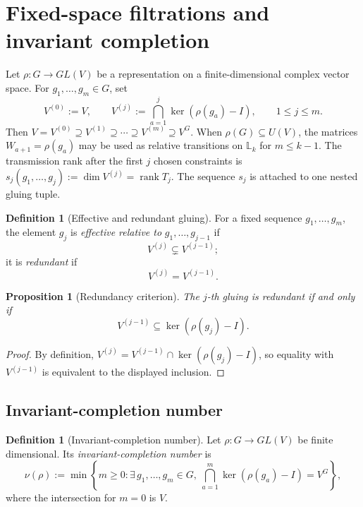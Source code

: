 \documentclass[11pt]{article}
\theoremstyle{plain}
\newtheorem{proposition}[theorem]{Proposition}
\theoremstyle{definition}
\newtheorem{definition}[theorem]{Definition}
\begin{document}
\section{Fixed-space filtrations and invariant completion}
\label{sec:invariant-completion}

Let \(\rho:G\to GL(V)\) be a representation on a finite-dimensional complex vector space. For \(g_1,\ldots,g_m\in G\), set
\[
V^{(0)}:=V,
\qquad
V^{(j)}
:=
\bigcap_{a=1}^{j}\ker(\rho(g_a)-I),
\qquad
1\leq j\leq m.
\]
Then
\(V=V^{(0)} \supseteq V^{(1)} \supseteq\cdots\supseteq V^{(m)} \supseteq V^G\).
When \(\rho(G)\subseteq U(V)\), the matrices \(W_{a+1}=\rho(g_a)\) may be used as relative transitions on \(\mathbb L_k\) for \(m\leq k-1\). The transmission rank after the first \(j\) chosen constraints is
\(s_j(g_1,\ldots,g_j) := \dim V^{(j)} = \operatorname{rank}T_j\).
The sequence \(s_j\) is attached to one nested gluing tuple.

\begin{definition}[Effective and redundant gluing]
\label{def:effective-gluing}
For a fixed sequence \(g_1,\ldots,g_m\), the element \(g_j\) is \emph{effective relative to} \(g_1,\ldots,g_{j-1}\) if
\[
V^{(j)}\subsetneq V^{(j-1)};
\]
it is \emph{redundant} if
\[
V^{(j)}=V^{(j-1)}.
\]
\end{definition}

\begin{proposition}[Redundancy criterion]
\label{prop:redundancy}
The \(j\)-th gluing is redundant if and only if
\[
V^{(j-1)}
\subseteq
\ker(\rho(g_j)-I).
\]
\end{proposition}

\begin{proof}
By definition,
\(V^{(j)} = V^{(j-1)}\cap\ker(\rho(g_j)-I)\),
so equality with \(V^{(j-1)}\) is equivalent to the displayed inclusion.
\end{proof}

\subsection{Invariant-completion number}

\begin{definition}[Invariant-completion number]
\label{def:completion-number}
Let \(\rho:G\to GL(V)\) be finite dimensional. Its \emph{invariant-completion number} is
\[
\nu(\rho)
:=
\min
\left\{
m\geq0:
\exists\,g_1,\ldots,g_m\in G,\ 
\bigcap_{a=1}^{m}\ker(\rho(g_a)-I)=V^G
\right\},
\]
where the intersection for \(m=0\) is \(V\).
\end{definition}
\end{document}
